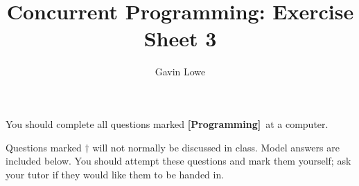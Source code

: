 \documentclass[fleqn,12pt]{article}
\title{Concurrent Programming: Exercise Sheet 3}
\author{Gavin Lowe}
\def\Programming{\textbf{[Programming]}}
\begin{document}
\maketitle


You should complete all questions marked \Programming\ at a computer.

Questions marked $\dagger$ will not normally be discussed in class.  Model
answers are included below.  You should attempt these questions and mark them
yourself; ask your tutor if they would like them to be handed in.


\end{document}
